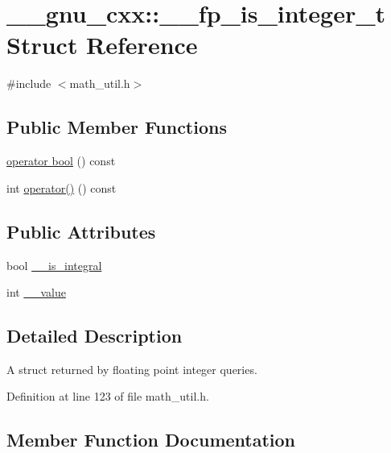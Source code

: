 \hypertarget{struct____gnu__cxx_1_1____fp__is__integer__t}{}\section{\+\_\+\+\_\+gnu\+\_\+cxx\+:\+:\+\_\+\+\_\+fp\+\_\+is\+\_\+integer\+\_\+t Struct Reference}
\label{struct____gnu__cxx_1_1____fp__is__integer__t}


{\ttfamily \#include $<$math\+\_\+util.\+h$>$}

\subsection*{Public Member Functions}
\begin{DoxyCompactItemize}
\item 
\hyperlink{struct____gnu__cxx_1_1____fp__is__integer__t_a55eeb43326a00c5e6495d989e0dd919b}{operator bool} () const
\item 
int \hyperlink{struct____gnu__cxx_1_1____fp__is__integer__t_a6882088e7fab26f8ded933146423fff6}{operator()} () const
\end{DoxyCompactItemize}
\subsection*{Public Attributes}
\begin{DoxyCompactItemize}
\item 
bool \hyperlink{struct____gnu__cxx_1_1____fp__is__integer__t_a11cf72023d9f2eb1e3982d093de58493}{\+\_\+\+\_\+is\+\_\+integral}
\item 
int \hyperlink{struct____gnu__cxx_1_1____fp__is__integer__t_ad30e10c2e2dc2b23d42b4bbbf5592425}{\+\_\+\+\_\+value}
\end{DoxyCompactItemize}


\subsection{Detailed Description}
A struct returned by floating point integer queries. 

Definition at line 123 of file math\+\_\+util.\+h.



\subsection{Member Function Documentation}
\mbox{\label{struct____gnu__cxx_1_1____fp__is__integer__t_a55eeb43326a00c5e6495d989e0dd919b}} 
